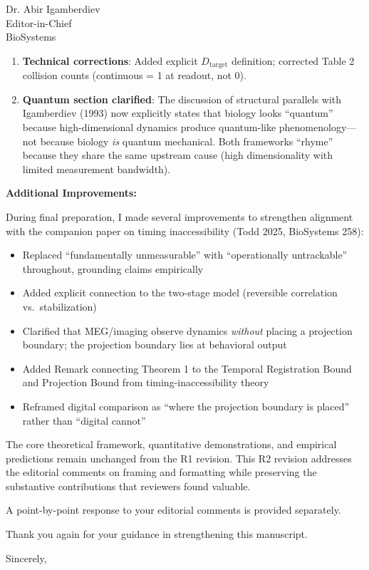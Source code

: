 \documentclass[11pt]{letter}
\begin{document}
\begin{letter}{Dr. Abir Igamberdiev\\Editor-in-Chief\\BioSystems}
\begin{enumerate}
\item \textbf{Technical corrections}: Added explicit $D_{\text{target}}$ definition; corrected Table 2 collision counts (continuous = 1 at readout, not 0).

\item \textbf{Quantum section clarified}: The discussion of structural parallels with Igamberdiev (1993) now explicitly states that biology looks ``quantum'' because high-dimensional dynamics produce quantum-like phenomenology---not because biology \textit{is} quantum mechanical. Both frameworks ``rhyme'' because they share the same upstream cause (high dimensionality with limited measurement bandwidth).
\end{enumerate}

\textbf{Additional Improvements:}

During final preparation, I made several improvements to strengthen alignment with the companion paper on timing inaccessibility (Todd 2025, BioSystems 258):

\begin{itemize}
\item Replaced ``fundamentally unmeasurable'' with ``operationally untrackable'' throughout, grounding claims empirically
\item Added explicit connection to the two-stage model (reversible correlation vs.\ stabilization)
\item Clarified that MEG/imaging observe dynamics \textit{without} placing a projection boundary; the projection boundary lies at behavioral output
\item Added Remark connecting Theorem 1 to the Temporal Registration Bound and Projection Bound from timing-inaccessibility theory
\item Reframed digital comparison as ``where the projection boundary is placed'' rather than ``digital cannot''
\end{itemize}

The core theoretical framework, quantitative demonstrations, and empirical predictions remain unchanged from the R1 revision. This R2 revision addresses the editorial comments on framing and formatting while preserving the substantive contributions that reviewers found valuable.

A point-by-point response to your editorial comments is provided separately.

Thank you again for your guidance in strengthening this manuscript.

\closing{Sincerely,}

\end{letter}
\end{document}
